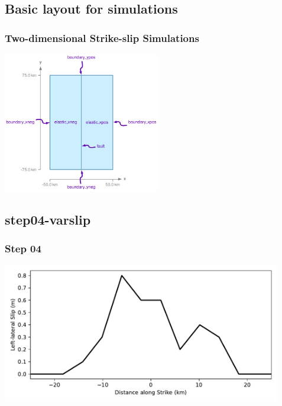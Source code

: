 \documentclass{beamer}
\begin{document}
\subsection{Basic layout for simulations}

\begin{frame}
  \frametitle{Two-dimensional Strike-slip Simulations}
  \summary{}

  \vfill
  \begin{center}
      \includegraphics[height=6.1cm]{figs/geometry}
  \end{center}
  \vfill

\end{frame}

\subsection{step04-varslip}

\begin{frame}
  \frametitle{Step 04}

  \vfill
  \begin{center}
      \includegraphics[height=6.1cm]{figs/step04-slip}
  \end{center}
\vfill
      
\end{frame}
\end{document}
